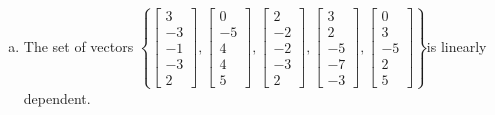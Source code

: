 \begin{exerciseAnswer}
\begin{enumerate}[(a)]
\item  The set of vectors \( \left\{ \left[\begin{array}{c}
3 \\
-3 \\
-1 \\
-3 \\
2
\end{array}\right] , \left[\begin{array}{c}
0 \\
-5 \\
4 \\
4 \\
5
\end{array}\right] , \left[\begin{array}{c}
2 \\
-2 \\
-2 \\
-3 \\
2
\end{array}\right] , \left[\begin{array}{c}
3 \\
2 \\
-5 \\
-7 \\
-3
\end{array}\right] , \left[\begin{array}{c}
0 \\
3 \\
-5 \\
2 \\
5
\end{array}\right] \right\} \)is linearly dependent.
\end{enumerate}
    
\end{exerciseAnswer}
    
